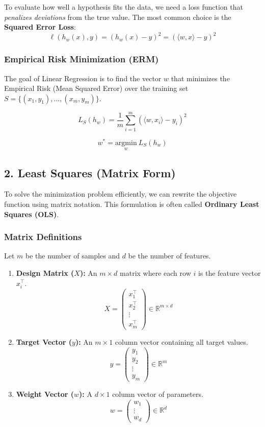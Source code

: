 \documentclass[
  italian,
  11pt,
]{article}
\begin{document}
To evaluate how well a hypothesis fits the data, we need a loss function
that \emph{penalizes deviations} from the true value. The most common
choice is the \textbf{Squared Error Loss}:
\[ \ell(h_w(x), y) = (h_w(x) - y)^2 = (\langle w, x \rangle - y)^2 \]

\subsubsection{Empirical Risk Minimization
(ERM)}\label{empirical-risk-minimization-erm-1}

The goal of Linear Regression is to find the vector \(w\) that minimizes
the Empirical Risk (Mean Squared Error) over the training set
\(S = \{(x_1, y_1), \dots, (x_m, y_m)\}\).

\[ L_S(h_w) = \frac{1}{m} \sum_{i=1}^{m} (\langle w, x_i \rangle - y_i)^2 \]

\[ w^* = \underset{w}{\text{argmin}} \ L_S(h_w) \]

\subsection{2. Least Squares (Matrix
Form)}\label{least-squares-matrix-form}

To solve the minimization problem efficiently, we can rewrite the
objective function using matrix notation. This formulation is often
called \textbf{Ordinary Least Squares (OLS)}.

\subsubsection{Matrix Definitions}\label{matrix-definitions}

Let \(m\) be the number of samples and \(d\) be the number of features.

\begin{enumerate}
\def\labelenumi{\arabic{enumi}.}
\item
  \textbf{Design Matrix (\(X\)):} An \(m \times d\) matrix where each
  row \(i\) is the feature vector \(x_i^\top\).
  \[ X = \begin{pmatrix} x_1^\top \\ x_2^\top \\ \vdots \\ x_m^\top \end{pmatrix} \in \mathbb{R}^{m \times d} \]
\item
  \textbf{Target Vector (\(y\)):} An \(m \times 1\) column vector
  containing all target values.
  \[ y = \begin{pmatrix} y_1 \\ y_2 \\ \vdots \\ y_m \end{pmatrix} \in \mathbb{R}^m \]
\item
  \textbf{Weight Vector (\(w\)):} A \(d \times 1\) column vector of
  parameters.
  \[ w = \begin{pmatrix} w_1 \\ \vdots \\ w_d \end{pmatrix} \in \mathbb{R}^d \]
\end{enumerate}
\end{document}
